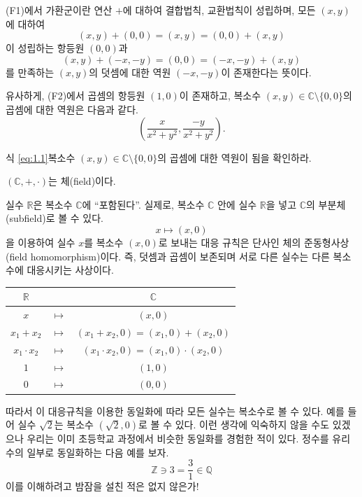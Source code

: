(F1)에서 가환군이란
연산 $+$에 대하여 결합법칙, 교환법칙이 성립하며,
모든 $(x,y)$에 대하여
$$
(x,y) + (0,0) = (x,y) = (0,0) + (x,y)
$$
이 성립하는 
항등원 $(0,0)$과 
$$
(x,y) + (-x,-y) = (0,0) = (-x,-y) + (x,y)
$$
를 만족하는 $(x,y)$의 덧셈에 대한 역원 $(-x, -y)$이  존재한다는 뜻이다.

유사하게, (F2)에서 곱셈의 항등원 $(1,0)$이 존재하고, 복소수 $(x,y) \in \mathbb C \setminus\{0,0\}$의
곱셈에 대한 역원은 다음과 같다.
\begin{equation} \label{eq:1.1}
\left( \dfrac{x}{x^2+y^2}, \dfrac{-y}{x^2+y^2} \right).
\end{equation}

\begin{salt_exercise} \label{ex-1-1}
식 \eqref{eq:1.1}\이 복소수 $(x,y) \in \mathbb C \setminus\{0,0\}$의 곱셈에 대한 역원이 됨을 확인하라.
\end{salt_exercise}

\begin{saltprop}{}{} \label{prop-1-1}
$(\mathbb C, +, \cdot)$는 체(field)이다.
\end{saltprop}

실수  $\mathbb R$은 복소수 $\mathbb C$에 ``포함된다''.
실제로, 복소수 $\mathbb C$ 안에 실수 $\mathbb R$을 넣고
$\mathbb C$의 부분체(subfield)로 볼 수 있다.
$$
x \mapsto (x,0)
$$
을 이용하여 실수 $x$를 복소수 $(x,0)$로 보내는 대응 규칙은
단사인 체의 준동형사상(field homomorphism)이다.
즉, 덧셈과 곱셈이 보존되며 서로 다른 실수는 다른 복소수에 대응시키는 사상이다.

\begin{center}
\begin{tabular}{|ccc|} \hline
$\mathbb R$ & & $\mathbb C$ \\ \hline \hline
$x$ & $\mapsto$ & $(x,0)$ \\ 
$x_1+x_2$ & $\mapsto$ & $(x_1+x_2,0) = (x_1,0) + (x_2,0)$ \\ 
$x_1\cdot x_2$ & $\mapsto$ & $(x_1\cdot x_2,0) = (x_1,0) \cdot (x_2,0)$ \\ 
$1$ & $\mapsto$ & $(1,0)$ \\
$0$ & $\mapsto$ & $(0,0)$ \\
\hline
\end{tabular}
\end{center}

따라서 이 대응규칙을 이용한 동일화에 따라 모든 실수는 복소수로 볼 수 있다.
예를 들어 실수 $\sqrt{2}$는 복소수 $(\sqrt{2},0)$로 볼 수 있다.
이런 생각에 익숙하지 않을 수도 있겠으나 우리는 이미 초등학교 과정에서
비슷한 동일화를 경험한 적이 있다. 정수를 유리수의 일부로 동일화하는
다음 예를 보자.
$$
\mathbb Z  \ni 3 = \frac31 \in \mathbb Q
$$
이를 이해하려고 밤잠을 설친 적은 없지 않은가!

